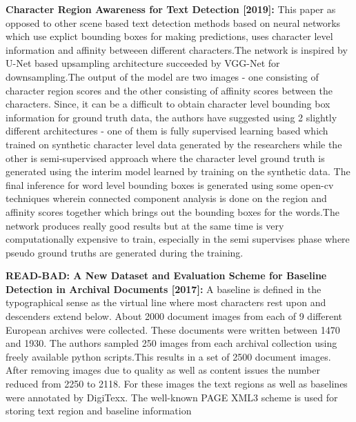 \textbf{Character Region Awareness for Text Detection [2019]\cite{5}:}
This paper as opposed to other scene based text detection methods based on neural networks which use explict bounding boxes for making predictions, uses character level information and affinity betweeen different characters.The network is inspired by U-Net based upsampling architecture succeeded by VGG-Net for downsampling.The output of the model are two images - one consisting of character region scores and the other consisting of affinity scores between the characters. Since, it can be a difficult to obtain character level bounding box information for ground truth data, the authors have suggested using 2 slightly different architectures - one of them is fully supervised learning based which trained on synthetic character level data generated by the researchers while the other is semi-supervised approach where the character level ground truth is generated using the interim model learned by training on the synthetic data. The final inference for word level bounding boxes is generated using some open-cv techniques wherein connected component analysis is done on the region and affinity scores together which brings out the bounding boxes for the words.The network produces really good results but at the same time is very computationally expensive to train, especially in the semi supervises phase where pseudo ground truths are generated during the training.

\textbf{READ-BAD: A New Dataset and Evaluation Scheme for Baseline Detection in Archival Documents [2017]\cite{6}:}
A baseline is defined in the typographical sense as the virtual line where most characters rest upon and descenders extend below. About 2000 document images from each of 9 different European archives were collected. These documents were written between 1470 and 1930. The authors sampled 250 images from each archival collection using freely available python scripts.This results in a set of 2500 document images. After removing images due to quality as well as content issues the number reduced from 2250 to 2118. For these images the text regions as well as baselines were annotated by DigiTexx. The well-known PAGE XML3 scheme is used for storing text region and baseline information


